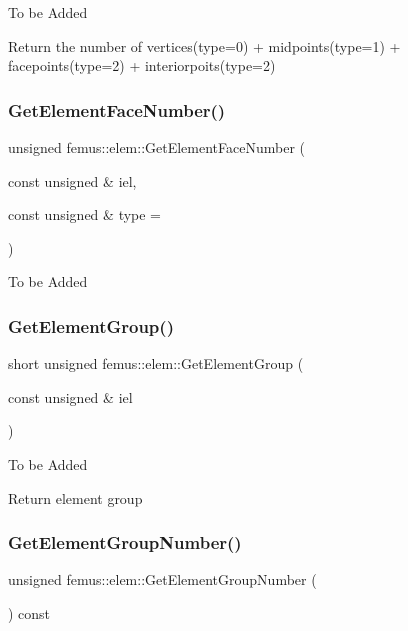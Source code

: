 To be Added

Return the number of vertices(type=0) + midpoints(type=1) + facepoints(type=2) + interiorpoits(type=2) \mbox{\label{classfemus_1_1elem_a9e82d71b6b7cf76e83e37767627130e3}} 
\subsubsection{\texorpdfstring{Get\+Element\+Face\+Number()}{GetElementFaceNumber()}}
{\footnotesize\ttfamily unsigned femus\+::elem\+::\+Get\+Element\+Face\+Number (\begin{DoxyParamCaption}\item[{const unsigned \&}]{iel,  }\item[{const unsigned \&}]{type = {} }\end{DoxyParamCaption})}

To be Added \mbox{\label{classfemus_1_1elem_acdd8b9d5723e673a72c22f1f74e13d2b}} 
\subsubsection{\texorpdfstring{Get\+Element\+Group()}{GetElementGroup()}}
{\footnotesize\ttfamily short unsigned femus\+::elem\+::\+Get\+Element\+Group (\begin{DoxyParamCaption}\item[{const unsigned \&}]{iel }\end{DoxyParamCaption})}

To be Added

Return element group \mbox{\label{classfemus_1_1elem_afb7f045c1d2f85aa101ae7e7d8230a9c}} 
\subsubsection{\texorpdfstring{Get\+Element\+Group\+Number()}{GetElementGroupNumber()}}
{\footnotesize\ttfamily unsigned femus\+::elem\+::\+Get\+Element\+Group\+Number (\begin{DoxyParamCaption}{ }\end{DoxyParamCaption}) const}

